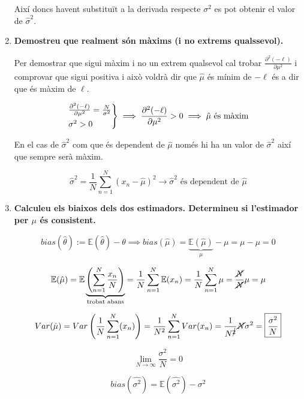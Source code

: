 \documentclass[a4paper]{article}
\begin{document}
\begin{enumerate}
Així doncs havent substituït a la derivada respecte $\sigma^2$ es pot obtenir el valor de $\hat{\sigma}^2$.

\item \textbf{Demostreu que realment són màxims (i no extrems qualssevol).}

Per demostrar que sigui màxim i no un extrem qualsevol cal trobar $\frac{\partial^2(-\ell)}{\partial \mu^2}$ i comprovar que sigui positiva i això voldrà dir que $\hat{\mu}$ és mínim de $-\ell$ és a dir que és màxim de $\ell$.

$$
\begin{rcases*}
\frac{\partial^2 (-\ell)}{\partial \mu^2} = \frac{N}{\sigma^2} \\
\sigma^2 > 0
\end{rcases*}
\implies \frac{\partial^2(-\ell)}{\partial\mu^2} > 0 \implies \hat{\mu} \text{ és màxim}
$$

En el cas de $\hat{\sigma}^2$ com que és dependent de $\hat{\mu}$ només hi ha un valor de $\hat{\sigma}^2$ així que sempre serà màxim.

$$ \hat{\sigma}^2 = \frac{1}{N} \sum_{n=1}^N (x_n - \hat{\mu})^2 \rightarrow \hat{\sigma}^2 \text{ és dependent de } \hat{\mu}$$

\item \textbf{Calculeu els biaixos dels dos estimadors. Determineu si l'estimador per $\mu$ és consistent.}

$$ bias(\hat{\theta}) := \mathbb{E}(\hat{\theta}) - \theta \implies bias(\hat{\mu}) = \underbrace{\mathbb{E}(\hat{\mu})}_{\mu} - \mu = \mu - \mu = 0 $$

$$ \mathbb{E}(\hat{\mu}) = \mathbb{E}\underbrace{\left(\sum_{n=1}^N \frac{x_n}{N}\right)}_{\text{trobat abans}} = \frac{1}{N}\sum_{n=1}^N \mathbb{E}(x_n) = \frac{1}{N}\sum_{n=1}^N \mu = \frac{\cancel{N}}{\cancel{N}}\mu = \mu$$

$$ Var(\hat{\mu}) = Var\left(\frac{1}{N} \sum_{n=1}^{N}(x_n)\right) = \frac{1}{N^2} \sum_{n=1}^{N}Var(x_n) = \frac{1}{N^{\cancel{2}}}\cancel{N}\sigma^2 = \boxed{\frac{\sigma^2}{N}}  $$

$$\lim_{N\to\infty} \frac{\sigma^2}{N} = 0$$

$$ bias(\hat{\sigma^2}) = \mathbb{E}(\hat{\sigma^2}) - \sigma^2 $$


\end{enumerate}
\end{document}
